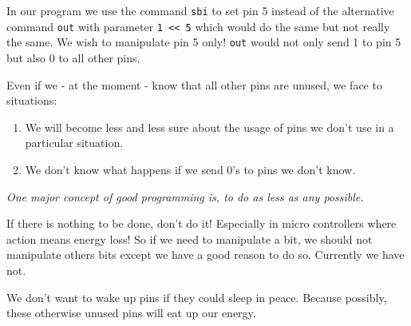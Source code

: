 In our program we use the command \texttt{sbi} to set pin 5 instead of the alternative command \texttt{out} with parameter \texttt{1 << 5} which would do the same but not really the same. We wish to manipulate pin 5 only! \texttt{out} would not only send 1 to pin 5 but also 0 to all other pins.

Even if we - at the moment - know that all other pins are unused, we face to situations:

\begin{enumerate}
  \item We will become less and less sure about the usage of pins we don't use in a particular situation.
  \item We don't know what happens if we send 0's to pins we don't know.
\end{enumerate}

\emph{One major concept of good programming is, to do as less as any possible.}

If there is nothing to be done, don't do it! Especially in micro controllers where action means energy loss! So if we need to manipulate a bit, we should not manipulate others bits except we have a good reason to do so. Currently we have not.

We don't want to wake up pins if they could sleep in peace. Because possibly, these otherwise unused pins will eat up our energy.

